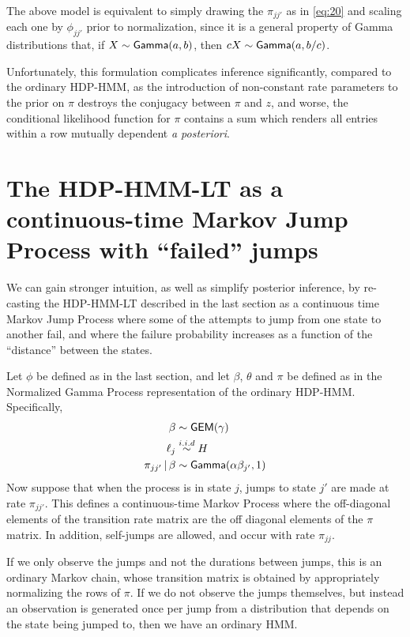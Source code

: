 The above model is equivalent to simply drawing the $\pi_{jj'}$ as in
\eqref{eq:20} and scaling each one by $\phi_{jj'}$ prior to
normalization, since it is a general property of Gamma distributions
that, if $X \sim \mathsf{Gamma}(a,b)$, then $cX \sim \mathsf{Gamma}(a,b/c)$.

Unfortunately, this formulation complicates inference significantly,
compared to the ordinary HDP-HMM, as the introduction of non-constant
rate parameters to the prior on $\pi$ destroys the conjugacy between
$\pi$ and $z$, and worse, the conditional likelihood function for
$\pi$ contains a sum which renders all entries within a row mutually
dependent {\em a posteriori}.

\section{The HDP-HMM-LT as a continuous-time Markov Jump Process with
``failed'' jumps}
\label{sec:dist-based-filt}

We can gain stronger intuition, as well as simplify posterior
inference, by re-casting the HDP-HMM-LT described in the last section
as a continuous time Markov Jump Process where some of the attempts to
jump from one state to another fail, and where the failure probability
increases as a function of the ``distance'' between the states.

Let $\phi$ be defined as in the last section, and let $\beta$,
$\theta$ and $\pi$ be defined as in the Normalized Gamma Process
representation of the ordinary HDP-HMM.  Specifically,
\begin{align}
  \label{eq:beta} \beta &\sim \mathsf{GEM}(\gamma) \\ \ell_j
&\stackrel{i.i.d}{\sim} H \\ \pi_{jj'} \, \vert \, \beta &\sim \mathsf{Gamma}(\alpha
\beta_{j'},1)
\end{align} Now suppose that when the process is in state $j$, jumps
to state $j'$ are made at rate $\pi_{jj'}$.  This defines a
continuous-time Markov Process where the off-diagonal elements of the
transition rate matrix are the off diagonal elements of the $\pi$
matrix.  In addition, self-jumps are allowed, and occur with rate
$\pi_{jj}$.

If we only observe the jumps and not the durations between jumps, this
is an ordinary Markov chain, whose transition matrix is obtained by
appropriately normalizing the rows of $\pi$.  If we do not observe the
jumps themselves, but instead an observation is generated once per
jump from a distribution that depends on the state being jumped to,
then we have an ordinary HMM.

